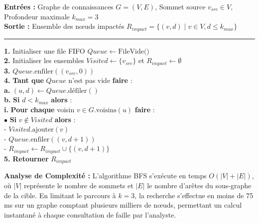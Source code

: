 \begin{tcolorbox}[colback=blue!3,colframe=blue!40,title=\textbf{Algorithme 4.1 : Calcul du Rayon d'Impact d'une Vuln\'erabilit\'e (BFS NetworkX)},fonttitle=\small\bfseries]
\small
\textbf{Entr\'ees :} Graphe de connaissances $G = (V, E)$, Sommet source $v_{src} \in V$, Profondeur maximale $k_{max} = 3$\\
\textbf{Sortie :} Ensemble des n\oe uds impact\'es $R_{impact} = \{(v, d) \mid v \in V, d \le k_{max}\}$
\vspace{2mm}
\hrule
\vspace{2mm}
\textbf{1.} Initialiser une file FIFO $Queue \leftarrow \text{FileVide()}$\\
\textbf{2.} Initialiser les ensembles $Visited \leftarrow \{v_{src}\}$ et $R_{impact} \leftarrow \emptyset$\\
\textbf{3.} $Queue.\text{enfiler}((v_{src}, 0))$\\
\textbf{4.} \textbf{Tant que} $Queue$ n'est pas vide \textbf{faire} :\\
\hspace*{6mm} \textbf{a.} $(u, d) \leftarrow Queue.\text{d\'efiler}()$\\
\hspace*{6mm} \textbf{b.} \textbf{Si} $d < k_{max}$ \textbf{alors} :\\
\hspace*{12mm} \textbf{i.} \textbf{Pour chaque} voisin $v \in G.\text{voisins}(u)$ \textbf{faire} :\\
\hspace*{18mm} $\bullet$ \textbf{Si} $v \notin Visited$ \textbf{alors} :\\
\hspace*{24mm} - $Visited.\text{ajouter}(v)$\\
\hspace*{24mm} - $Queue.\text{enfiler}((v, d + 1))$\\
\hspace*{24mm} - $R_{impact} \leftarrow R_{impact} \cup \{(v, d + 1)\}$\\
\textbf{5.} \textbf{Retourner} $R_{impact}$
\end{tcolorbox}

\par \textbf{Analyse de Complexit\'e :} L'algorithme BFS s'ex\'ecute en temps $O(|V| + |E|)$, o\`u $|V|$ repr\'esente le nombre de sommets et $|E|$ le nombre d'ar\^etes du sous-graphe de la cible. En limitant le parcours \`a $k=3$, la recherche s'effectue en moins de 75 ms sur un graphe comptant plusieurs milliers de n\oe uds, permettant un calcul instantan\'e \`a chaque consultation de faille par l'analyste.


